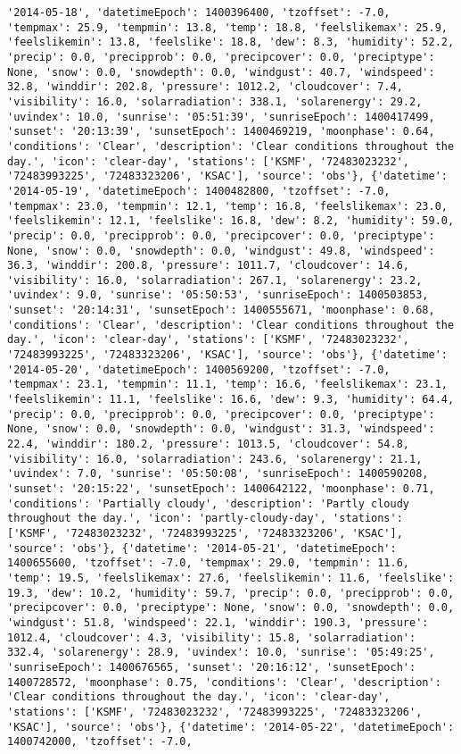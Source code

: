 \documentclass[
  letterpaper,
  DIV=11,
  numbers=noendperiod]{scrartcl}
\begin{document}
\begin{verbatim}
'2014-05-18', 'datetimeEpoch': 1400396400, 'tzoffset': -7.0, 'tempmax': 25.9, 'tempmin': 13.8, 'temp': 18.8, 'feelslikemax': 25.9, 'feelslikemin': 13.8, 'feelslike': 18.8, 'dew': 8.3, 'humidity': 52.2, 'precip': 0.0, 'precipprob': 0.0, 'precipcover': 0.0, 'preciptype': None, 'snow': 0.0, 'snowdepth': 0.0, 'windgust': 40.7, 'windspeed': 32.8, 'winddir': 202.8, 'pressure': 1012.2, 'cloudcover': 7.4, 'visibility': 16.0, 'solarradiation': 338.1, 'solarenergy': 29.2, 'uvindex': 10.0, 'sunrise': '05:51:39', 'sunriseEpoch': 1400417499, 'sunset': '20:13:39', 'sunsetEpoch': 1400469219, 'moonphase': 0.64, 'conditions': 'Clear', 'description': 'Clear conditions throughout the day.', 'icon': 'clear-day', 'stations': ['KSMF', '72483023232', '72483993225', '72483323206', 'KSAC'], 'source': 'obs'}, {'datetime': '2014-05-19', 'datetimeEpoch': 1400482800, 'tzoffset': -7.0, 'tempmax': 23.0, 'tempmin': 12.1, 'temp': 16.8, 'feelslikemax': 23.0, 'feelslikemin': 12.1, 'feelslike': 16.8, 'dew': 8.2, 'humidity': 59.0, 'precip': 0.0, 'precipprob': 0.0, 'precipcover': 0.0, 'preciptype': None, 'snow': 0.0, 'snowdepth': 0.0, 'windgust': 49.8, 'windspeed': 36.3, 'winddir': 200.8, 'pressure': 1011.7, 'cloudcover': 14.6, 'visibility': 16.0, 'solarradiation': 267.1, 'solarenergy': 23.2, 'uvindex': 9.0, 'sunrise': '05:50:53', 'sunriseEpoch': 1400503853, 'sunset': '20:14:31', 'sunsetEpoch': 1400555671, 'moonphase': 0.68, 'conditions': 'Clear', 'description': 'Clear conditions throughout the day.', 'icon': 'clear-day', 'stations': ['KSMF', '72483023232', '72483993225', '72483323206', 'KSAC'], 'source': 'obs'}, {'datetime': '2014-05-20', 'datetimeEpoch': 1400569200, 'tzoffset': -7.0, 'tempmax': 23.1, 'tempmin': 11.1, 'temp': 16.6, 'feelslikemax': 23.1, 'feelslikemin': 11.1, 'feelslike': 16.6, 'dew': 9.3, 'humidity': 64.4, 'precip': 0.0, 'precipprob': 0.0, 'precipcover': 0.0, 'preciptype': None, 'snow': 0.0, 'snowdepth': 0.0, 'windgust': 31.3, 'windspeed': 22.4, 'winddir': 180.2, 'pressure': 1013.5, 'cloudcover': 54.8, 'visibility': 16.0, 'solarradiation': 243.6, 'solarenergy': 21.1, 'uvindex': 7.0, 'sunrise': '05:50:08', 'sunriseEpoch': 1400590208, 'sunset': '20:15:22', 'sunsetEpoch': 1400642122, 'moonphase': 0.71, 'conditions': 'Partially cloudy', 'description': 'Partly cloudy throughout the day.', 'icon': 'partly-cloudy-day', 'stations': ['KSMF', '72483023232', '72483993225', '72483323206', 'KSAC'], 'source': 'obs'}, {'datetime': '2014-05-21', 'datetimeEpoch': 1400655600, 'tzoffset': -7.0, 'tempmax': 29.0, 'tempmin': 11.6, 'temp': 19.5, 'feelslikemax': 27.6, 'feelslikemin': 11.6, 'feelslike': 19.3, 'dew': 10.2, 'humidity': 59.7, 'precip': 0.0, 'precipprob': 0.0, 'precipcover': 0.0, 'preciptype': None, 'snow': 0.0, 'snowdepth': 0.0, 'windgust': 51.8, 'windspeed': 22.1, 'winddir': 190.3, 'pressure': 1012.4, 'cloudcover': 4.3, 'visibility': 15.8, 'solarradiation': 332.4, 'solarenergy': 28.9, 'uvindex': 10.0, 'sunrise': '05:49:25', 'sunriseEpoch': 1400676565, 'sunset': '20:16:12', 'sunsetEpoch': 1400728572, 'moonphase': 0.75, 'conditions': 'Clear', 'description': 'Clear conditions throughout the day.', 'icon': 'clear-day', 'stations': ['KSMF', '72483023232', '72483993225', '72483323206', 'KSAC'], 'source': 'obs'}, {'datetime': '2014-05-22', 'datetimeEpoch': 1400742000, 'tzoffset': -7.0, 
\end{verbatim}
\end{document}
